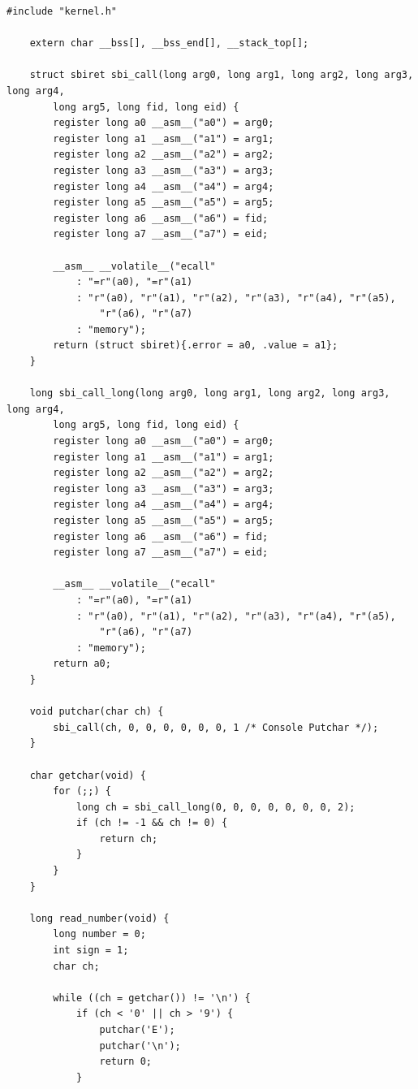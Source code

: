 \documentclass{article}
\begin{document}
\begin{lstlisting}[caption={kernel.ld}, label={lst:example}]
    #include "kernel.h"

    extern char __bss[], __bss_end[], __stack_top[];

    struct sbiret sbi_call(long arg0, long arg1, long arg2, long arg3, long arg4,
        long arg5, long fid, long eid) {
        register long a0 __asm__("a0") = arg0;
        register long a1 __asm__("a1") = arg1;
        register long a2 __asm__("a2") = arg2;
        register long a3 __asm__("a3") = arg3;
        register long a4 __asm__("a4") = arg4;
        register long a5 __asm__("a5") = arg5;
        register long a6 __asm__("a6") = fid;
        register long a7 __asm__("a7") = eid;

        __asm__ __volatile__("ecall"
            : "=r"(a0), "=r"(a1)
            : "r"(a0), "r"(a1), "r"(a2), "r"(a3), "r"(a4), "r"(a5),
                "r"(a6), "r"(a7)
            : "memory");
        return (struct sbiret){.error = a0, .value = a1};
    }

    long sbi_call_long(long arg0, long arg1, long arg2, long arg3, long arg4,
        long arg5, long fid, long eid) {
        register long a0 __asm__("a0") = arg0;
        register long a1 __asm__("a1") = arg1;
        register long a2 __asm__("a2") = arg2;
        register long a3 __asm__("a3") = arg3;
        register long a4 __asm__("a4") = arg4;
        register long a5 __asm__("a5") = arg5;
        register long a6 __asm__("a6") = fid;
        register long a7 __asm__("a7") = eid;

        __asm__ __volatile__("ecall"
            : "=r"(a0), "=r"(a1)
            : "r"(a0), "r"(a1), "r"(a2), "r"(a3), "r"(a4), "r"(a5),
                "r"(a6), "r"(a7)
            : "memory");
        return a0;
    }

    void putchar(char ch) {
        sbi_call(ch, 0, 0, 0, 0, 0, 0, 1 /* Console Putchar */);
    }

    char getchar(void) {
        for (;;) {
            long ch = sbi_call_long(0, 0, 0, 0, 0, 0, 0, 2);
            if (ch != -1 && ch != 0) {
                return ch;
            }
        }
    }

    long read_number(void) {
        long number = 0; 
        int sign = 1;    
        char ch;

        while ((ch = getchar()) != '\n') { 
            if (ch < '0' || ch > '9') {
                putchar('E'); 
                putchar('\n');
                return 0; 
            }


\end{lstlisting}
\end{document}
